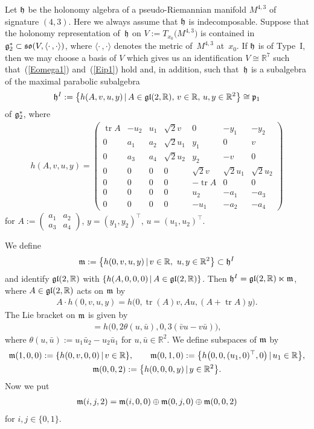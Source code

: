 \documentclass[pdftex]{sigma}
\numberwithin{equation}{section}
\newcommand\fg{{\frak{g}}}
\newcommand\fh{{\frak h}}
\newcommand\fm{{\frak m}}
\newcommand\fp{{\frak p}}
\newcommand{\fgl}{\mathop{{\frak g \frak l}}}
\newcommand{\fso}{\mathop{{\frak s \frak o}}}
\newcommand\RR{{\mathbb R}}
\newcommand\ip{{\langle\cdot \,,\cdot \rangle}}
\newcommand{\tr}{\operatorname{tr}}
\begin{document}
Let $\fh$ be the holonomy algebra of a pseudo-Riemannian manifold $M^{4,3}$ of signature $(4,3)$. Here we always assume that $\fh$ is indecomposable. Suppose that the holonomy representation of~$\fh$ on $V:=T_{x_0}\big(M^{4,3}\big)$ is contained in $\fg_2^*\subset \fso(V,\ip)$, where $\ip$ denotes the metric of~$M^{4,3}$ at~$x_0$. If $\fh$ is of Type~I, then we may choose a basis of $V$ which gives us an identification $V\cong\RR^7$ such that~(\ref{Eomega1}) and~(\ref{Eip1}) hold and, in addition, such that~$\fh$ is a subalgebra of the maximal parabolic subalgebra
\begin{gather}\label{EhI}
\fh^I:=\big\{ h(A,v,u,y)\,|\, A\in\fgl(2,\RR),\, v\in\RR,\, u, y \in\RR^2\big\}\cong \fp_1
\end{gather}
of $\fg_2^*$, where
\begin{gather*}h(A,v, u,y)= \left(
\begin{matrix}
\tr A &-u_2&u_1&\sqrt 2 v&0&-y_1&-y_2\\
0&a_1&a_2&\sqrt 2 u_1&y_1&0&v\\
0&a_3&a_4&\sqrt 2 u_2&y_2&-v&0\\
0&0&0&0&\sqrt 2 v&\sqrt 2 u_1&\sqrt 2 u_2\\
0&0&0&0&-\tr A&0&0\\
0&0&0&0&u_2&-a_1&-a_3\\
0&0&0&0&-u_1&-a_2&-a_4
	\end{matrix}\right)\end{gather*}
for	$ A:=\left(\begin{smallmatrix} a_1&a_2\\a_3&a_4\end{smallmatrix}\right)$, $y=(y_1,y_2)^\top$, $u=(u_1,u_2)^\top$.

We define
\begin{gather*} \fm:=\big\{h(0,v,u,y)\,|\, v\in\RR,\ u, y \in\RR^2\big\}\subset \fh^I\end{gather*}
and identify $\fgl(2,\RR)$ with $\{h(A,0,0,0)\,|\, A\in \fgl(2,\RR)\}$. Then $\fh^I=\fgl(2,\RR)\ltimes \fm$, where $A\in\fgl(2,\RR)$ acts on $\fm$ by
\begin{gather*}
A\cdot h(0,v,u,y)= h\big(0,\tr(A)v,Au,(A+\tr A)y\big).
\end{gather*}
The Lie bracket on $\fm$ is given by
\begin{gather*}
[h(0,v,u,y),h(0,\bar v,\bar u,\bar y)]=h\big(0,2\theta(u,\bar u),0,3(\bar v u-v\bar u)\big),
\end{gather*}
where $\theta(u,\bar u):=u_1\bar u_2-u_2\bar u_1$ for $u,\bar u\in\RR^2$. We define subspaces of $\fm$ by
\begin{gather*}
\fm(1,0,0):= \{h(0,v,0,0)\,|\, v\in\RR\},\qquad
\fm(0,1,0):= \big\{h\big(0,0,(u_1,0)^\top, 0\big)\,|\, u_1\in\RR\big\},\\
\fm(0,0,2):= \big\{h(0,0,0, y)\,|\, y\in\RR^2\big\}.
\end{gather*}
Now we put
\begin{gather*}\fm(i,j,2)= \fm(i,0,0)\oplus\fm(0,j,0)\oplus \fm(0,0,2)\end{gather*}
for $i,j\in\{0,1\}$.
\end{document}

